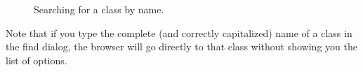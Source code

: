\documentclass[a4paper,10pt,twoside]{book}
\begin{document}
\begin{figure}[hbt]
\centerline{
}
\caption{Searching for a class by name.
\label{fig:findit}}
\end{figure}

Note that if you type the complete (and correctly capitalized) name of a class in the find dialog, the browser will go directly to that class without showing you the list of options.
\end{document}
